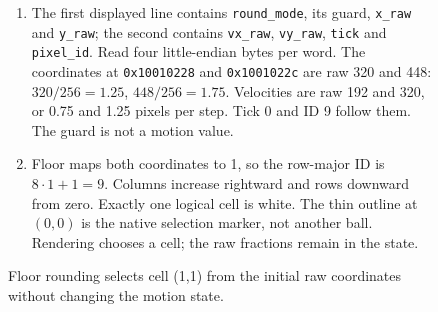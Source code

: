 \begin{figure}[htbp]
\begin{minipage}{\linewidth}
\begin{enumerate}
      \item The first displayed line contains \texttt{round\_mode}, its guard, \texttt{x\_raw} and \texttt{y\_raw}; the second contains \texttt{vx\_raw}, \texttt{vy\_raw}, \texttt{tick} and \texttt{pixel\_id}. Read four little-endian bytes per word. The coordinates at \texttt{0x10010228} and \texttt{0x1001022c} are raw 320 and 448: $320/256=1.25$, $448/256=1.75$. Velocities are raw 192 and 320, or 0.75 and 1.25 pixels per step. Tick 0 and ID 9 follow them. The guard is not a motion value.
      \item Floor maps both coordinates to 1, so the row-major ID is $8\cdot1+1=9$. Columns increase rightward and rows downward from zero. Exactly one logical cell is white. The thin outline at $(0,0)$ is the native selection marker, not another ball. Rendering chooses a cell; the raw fractions remain in the state.
    \end{enumerate}
  \end{minipage}
  \caption{Floor rounding selects cell (1,1) from the initial raw coordinates without changing the motion state.}
  \label{capture:012-fixed-point-ball-f01-floor}
  \label{ball-f01-floor}
\end{figure}
\par
